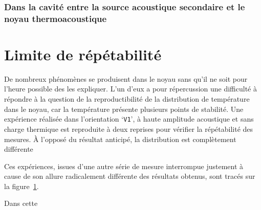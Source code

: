 \subsubsection{Dans la cavité entre la source acoustique secondaire et le noyau thermoacoustique}

%    
%
%    

\section{Limite de répétabilité}

De nombreux phénomènes se produisent dans le noyau sans qu'il ne soit pour l'heure possible des les expliquer. L'un d'eux a pour répercussion une difficulté à répondre à la question de la reproductibilité de la distribution de température dans le noyau, car la température présente plusieurs points de stabilité. Une expérience réalisée dans l'orientation `\texttt{V1}', à haute amplitude acoustique et sans charge thermique est reproduite à deux reprises pour vérifier la répétabilité des mesures. À l'opposé du résultat anticipé, la distribution est complètement différente   

Ces expériences, issues d'une autre série de mesure interrompue justement à cause de son allure radicalement différente des résultats obtenus, sont tracés sur la figure~\ref{fig:Repetabilite_V1}.

\begin{figure}[!ht]
    \centering
    
    \caption{}
    \label{fig:Repetabilite_V1}
\end{figure}

Dans cette


